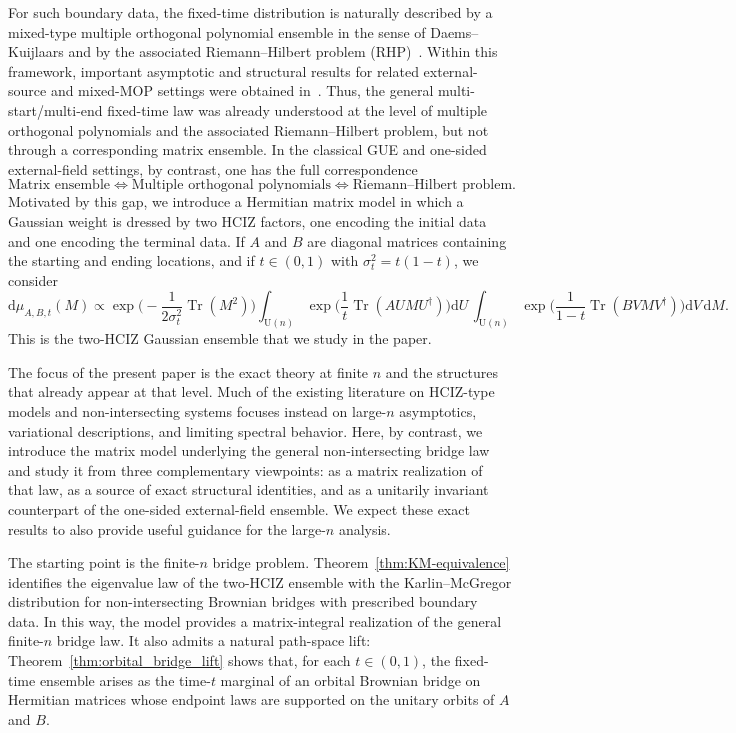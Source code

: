 \documentclass[11pt,a4paper]{article}
\theoremstyle{definition}\newtheorem{definition}[theorem]{Definition}
\theoremstyle{remark}\newtheorem{remark}[theorem]{Remark}
\numberwithin{equation}{section}
\DeclareMathOperator{\Tr}{Tr}
\newcommand{\dd}{\mathrm{d}}
\newcommand{\UU}{\mathrm{U}(n)}
\begin{document}
For such boundary data, the fixed-time distribution is naturally described by a mixed-type multiple orthogonal polynomial ensemble in the sense of Daems--Kuijlaars and by the associated Riemann--Hilbert problem (RHP)~\cite{DaemsKuijlaars2007,Kuijlaars2010}.  Within this framework, important asymptotic and structural results for related external-source and mixed-MOP settings were obtained in~\cite{Bleher2011,BleherDelvauxKuijlaars2011,AriznabarretaManas2015,BerezinKuijlaarsParra2023}. Thus, the general multi-start/multi-end fixed-time law was already understood at the level of multiple orthogonal polynomials and the associated Riemann--Hilbert problem, but not through a corresponding matrix ensemble. In the classical GUE and one-sided external-field settings, by contrast, one has the full correspondence
\begin{equation}
\text{Matrix ensemble}
\Longleftrightarrow
\text{Multiple orthogonal polynomials}
\Longleftrightarrow
\text{Riemann--Hilbert problem}.
\end{equation}
Motivated by this gap, we introduce a Hermitian matrix model in which a Gaussian weight is dressed by two HCIZ factors, one encoding the initial data and one encoding the terminal data. If $A$ and $B$ are diagonal matrices containing the starting and ending locations, and if $t\in(0,1)$ with $\sigma_t^2=t(1-t)$, we consider
\begin{equation*}
\dd\mu_{A,B,t}(M)\propto
\exp\bigl(-\frac{1}{2\sigma_t^2}\Tr(M^2)\bigr)
\int_{\UU}\exp\bigl(\frac{1}{t}\Tr(AUMU^\dagger)\bigr)\dd U\,
\int_{\UU}\exp\bigl(\frac{1}{1-t}\Tr(BVMV^\dagger)\bigr)\dd V\,\dd M.
\end{equation*}
This is the two-HCIZ Gaussian ensemble that we study in the paper.


The focus of the present paper is the exact theory at finite $n$ and the structures that already appear at that level. Much of the existing literature on HCIZ-type models and non-intersecting systems focuses instead on large-$n$ asymptotics, variational descriptions, and limiting spectral behavior. Here, by contrast, we introduce the matrix model underlying the general non-intersecting bridge law and study it from three complementary viewpoints: as a matrix realization of that law, as a source of exact structural identities, and as a unitarily invariant counterpart of the one-sided external-field ensemble. We expect these exact results to also provide useful guidance for the large-$n$ analysis.

The starting point is the finite-$n$ bridge problem. Theorem~\ref{thm:KM-equivalence} identifies the eigenvalue law of the two-HCIZ ensemble with the Karlin--McGregor distribution for non-intersecting Brownian bridges with prescribed boundary data. In this way, the model provides a matrix-integral realization of the general finite-$n$ bridge law. It also admits a natural path-space lift: Theorem~\ref{thm:orbital_bridge_lift} shows that, for each $t\in(0,1)$, the fixed-time ensemble arises as the time-$t$ marginal of an orbital Brownian bridge on Hermitian matrices whose endpoint laws are supported on the unitary orbits of $A$ and $B$.
\end{document}

